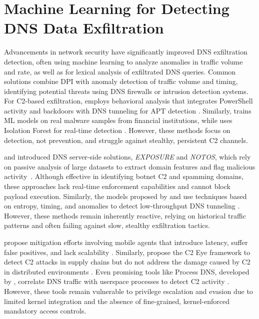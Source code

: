 \documentclass [11pt, proquest] {uwthesis}[2020/02/24]
\begin{document}
\section{Machine Learning for Detecting DNS Data Exfiltration}
Advancements in network security have significantly improved DNS exfiltration detection, often using machine learning to analyze anomalies in traffic volume and rate, as well as for lexical analysis of exfiltrated DNS queries. Common solutions combine DPI with anomaly detection of traffic volume and timing, identifying potential threats using DNS firewalls or intrusion detection systems. For C2-based exfiltration, \citeauthor{apt-process} employs behavioral analysis that integrates PowerShell activity and backdoors with DNS tunneling for APT detection \cite{apt-process}. Similarly, \citeauthor{Das} trains ML models on real malware samples from financial institutions, while \citeauthor{8717806d} uses Isolation Forest for real-time detection \cite{Das,8717806d}. However, these methods focus on detection, not prevention, and struggle against stealthy, persistent C2 channels.

\citeauthor{bilge2011exposure} and \citeauthor{antonakakis2010building} introduced DNS server-side solutions, \textit{EXPOSURE} and \textit{NOTOS}, which rely on passive analysis of large datasets to extract domain features and flag malicious activity~\cite{bilge2011exposure, antonakakis2010building}. Although effective in identifying botnet C2 and spamming domains, these approaches lack real-time enforcement capabilities and cannot block payload execution. Similarly, the models proposed by \citeauthor{DBLP:journals/corr/abs-1709-08395} and \citeauthor{10.1145/3230833.3233278} use techniques based on entropy, timing, and anomalies to detect low-throughput DNS tunneling \cite{DBLP:journals/corr/abs-1709-08395, 10.1145/3230833.3233278}. However, these methods remain inherently reactive, relying on historical traffic patterns and often failing against slow, stealthy exfiltration tactics.

\citeauthor{9486400} propose mitigation efforts involving mobile agents that introduce latency, suffer false positives, and lack scalability \cite{9486400}. Similarly, \citeauthor{haider2024c2} propose the C2 Eye framework to detect C2 attacks in supply chains but do not address the damage caused by C2 in distributed environments \cite{haider2024c2}. Even promising tools like Process DNS, developed by \citeauthor{sivakorn2019countering}, correlate DNS traffic with userspace processes to detect C2 activity \cite{sivakorn2019countering}. However, these tools remain vulnerable to privilege escalation and evasion due to limited kernel integration and the absence of fine-grained, kernel-enforced mandatory access controls.
\end{document}
